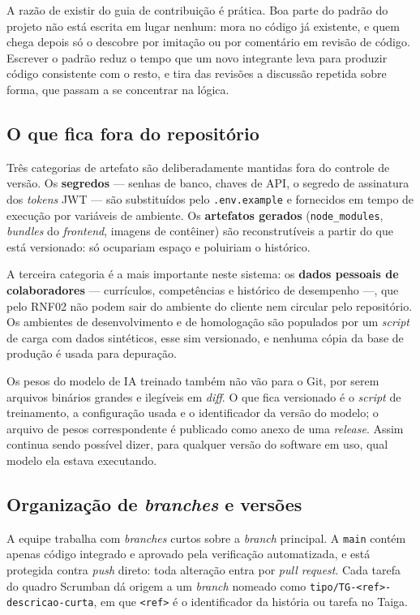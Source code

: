 \documentclass[a4paper,12pt,oneside,openany]{book}
\begin{document}
A razão de existir do guia de contribuição é prática. Boa parte do padrão do
projeto não está escrita em lugar nenhum: mora no código já existente, e quem
chega depois só o descobre por imitação ou por comentário em revisão de código.
Escrever o padrão reduz o tempo que um novo integrante leva para produzir
código consistente com o resto, e tira das revisões a discussão repetida sobre
forma, que passam a se concentrar na lógica.

\subsection{O que fica fora do repositório}

Três categorias de artefato são deliberadamente mantidas fora do controle de
versão. Os \textbf{segredos} --- senhas de banco, chaves de API, o segredo de
assinatura dos \textit{tokens} JWT --- são substituídos pelo
\texttt{.env.example} e fornecidos em tempo de execução por variáveis de
ambiente. Os \textbf{artefatos gerados} (\texttt{node\_modules},
\textit{bundles} do \textit{frontend}, imagens de contêiner) são
reconstrutíveis a partir do que está versionado: só ocupariam espaço e
poluiriam o histórico.

A terceira categoria é a mais importante neste sistema: os \textbf{dados
pessoais de colaboradores} --- currículos, competências e histórico de
desempenho ---, que pelo RNF02 não podem sair do ambiente do cliente nem
circular pelo repositório. Os ambientes de desenvolvimento e de homologação são
populados por um \textit{script} de carga com dados sintéticos, esse sim
versionado, e nenhuma cópia da base de produção é usada para depuração.

Os pesos do modelo de IA treinado também não vão para o Git, por serem arquivos
binários grandes e ilegíveis em \textit{diff}. O que fica versionado é o
\textit{script} de treinamento, a configuração usada e o identificador da
versão do modelo; o arquivo de pesos correspondente é publicado como anexo de
uma \textit{release}. Assim continua sendo possível dizer, para qualquer versão
do software em uso, qual modelo ela estava executando.

\subsection{Organização de \textit{branches} e versões}

A equipe trabalha com \textit{branches} curtos sobre a \textit{branch}
principal. A \texttt{main} contém apenas código integrado e aprovado pela
verificação automatizada, e está protegida contra \textit{push} direto: toda
alteração entra por \textit{pull request}. Cada tarefa do quadro Scrumban dá
origem a um \textit{branch} nomeado como
\texttt{tipo/TG-<ref>-descricao-curta}, em que \texttt{<ref>} é o identificador
da história ou tarefa no Taiga.
\end{document}
